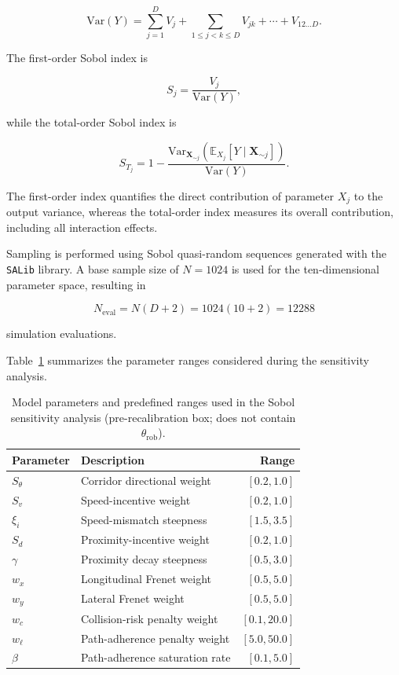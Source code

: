 \documentclass[conference]{IEEEtran}
\begin{document}
\begin{equation}
\label{eq:variance_decomposition}
\mathrm{Var}(Y)
=
\sum_{j=1}^{D}V_j
+
\sum_{1\le j<k\le D}V_{jk}
+\cdots+
V_{12\ldots D}.
\end{equation}

The first-order Sobol index is

\begin{equation}
\label{eq:S1_def}
S_j
=
\frac{V_j}{\mathrm{Var}(Y)},
\end{equation}

while the total-order Sobol index is

\begin{equation}
\label{eq:ST_def}
S_{T_j}
=
1-
\frac{
\mathrm{Var}_{\mathbf{X}_{\sim j}}
\!\left(
\mathbb{E}_{X_j}
\left[
Y\mid
\mathbf{X}_{\sim j}
\right]
\right)
}
{\mathrm{Var}(Y)}.
\end{equation}

The first-order index quantifies the direct contribution of parameter \(X_j\) to the output variance, whereas the total-order index measures its overall contribution, including all interaction effects.

Sampling is performed using Sobol quasi-random sequences generated with the \texttt{SALib} library. A base sample size of \(N=1024\) is used for the ten-dimensional parameter space, resulting in

\[
N_{\mathrm{eval}}
=
N(D+2)
=
1024(10+2)
=
12288
\]

simulation evaluations.

Table~\ref{tab:gsa_param_ranges_report} summarizes the parameter ranges considered during the sensitivity analysis.

\begin{table}[h]
\centering
\caption{Model parameters and predefined ranges used in the Sobol sensitivity analysis (pre-recalibration box; does not contain $\theta_{\mathrm{rob}}$).}
\label{tab:gsa_param_ranges_report}
\begin{tabular}{llr}
\hline
Parameter & Description & Range\\
\hline
\(S_{\theta}\) & Corridor directional weight & \([0.2,1.0]\)\\
\(S_v\) & Speed-incentive weight & \([0.2,1.0]\)\\
\(\xi_i\) & Speed-mismatch steepness & \([1.5,3.5]\)\\
\(S_d\) & Proximity-incentive weight & \([0.2,1.0]\)\\
\(\gamma\) & Proximity decay steepness & \([0.5,3.0]\)\\
\(w_x\) & Longitudinal Frenet weight & \([0.5,5.0]\)\\
\(w_y\) & Lateral Frenet weight & \([0.5,5.0]\)\\
\(w_c\) & Collision-risk penalty weight & \([0.1,20.0]\)\\
\(w_{\ell}\) & Path-adherence penalty weight & \([5.0,50.0]\)\\
\(\beta\) & Path-adherence saturation rate & \([0.1,5.0]\)\\
\hline
\end{tabular}
\end{table}
\end{document}
